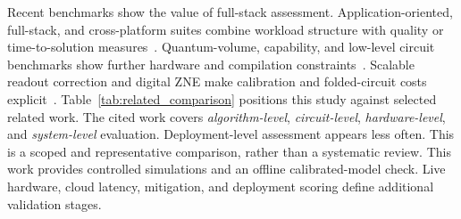\documentclass[final,5p,times,number]{elsarticle}
\begin{document}
Recent benchmarks show the value of full-stack assessment. Application-oriented, full-stack, and cross-platform suites combine workload structure with quality or time-to-solution measures~\cite{mills2021holistic,lubinski2023application,tomesh2022supermarq,donkers2022qpack}. Quantum-volume, capability, and low-level circuit benchmarks show further hardware and compilation constraints~\cite{cross2019validating,proctor2022measuring,li2020qasmbench}. Scalable readout correction and digital ZNE make calibration and folded-circuit costs explicit~\cite{nation2021scalable,maciejewski2020readout,giurgica2020digital}. Table~\ref{tab:related_comparison} positions this study against selected related work. The cited work covers \emph{algorithm-level}, \emph{circuit-level}, \emph{hardware-level}, and \emph{system-level} evaluation. Deployment-level assessment appears less often. This is a scoped and representative comparison, rather than a systematic review. This work provides controlled simulations and an offline calibrated-model check. Live hardware, cloud latency, mitigation, and deployment scoring define additional validation stages.
\end{document}
